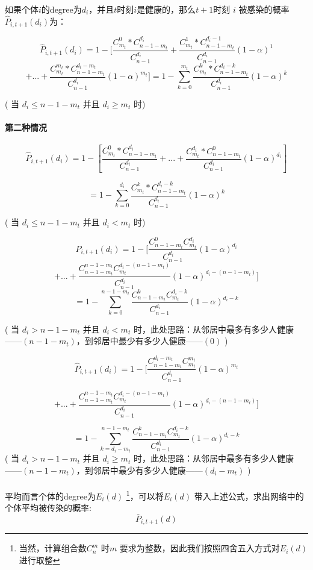 \documentclass[a4paper]{article}
\begin{document}
如果个体$i$的degree为$d_i$，并且$t$时刻$i$是健康的，那么$t+1$时刻 $i$ 被感染的概率$\hat{P}_{i,t+1}(d_i)$为：

\[\hat{P}_{i,t+1}(d_i)  =  1-[\frac{C_{m_t}^0*C_{n-1-m_t}^{d_i}} {C_{n-1}^{d_i}} +\frac{C_{m_t}^{1}*C_{n-1-m_t}^{d_i-1}} {C_{n-1}^{d_i}}(1-\alpha)^{1} \]
\[+  ...+  \frac{C_{m_t}^{m_t}*C_{n-1-m_t}^{d_i-m_t}}{C_{n-1}^{d_i}}(1-\alpha)^{m_t}    ]=1-\sum_{k=0}^{m_t} \frac{C_{m_t}^{k}*C_{n-1-m_t}^{d_i-k}}  {C_{n-1}^{d_i}} (1-\alpha)^k \]

( 当 $d_i\leq n-1-m_t$  并且 $d_i \geq m_t$ 时)
\paragraph{第二种情况}
\[\hat{P}_{i,t+1}(d_i)  =  1-[\frac{C_{m_t}^0*C_{n-1-m_t}^{d_i}} {C_{n-1}^{d_i}} + ...+  \frac{C_{m_t}^{d_i}*C_{n-1-m_t}^{0}}{C_{n-1}^{d_i}}(1-\alpha)^{d_i} ]   \]

\[=1-\sum_{k=0}^{d_i} \frac{C_{m_t}^{k}*C_{n-1-m_t}^{d_i-k}}  {C_{n-1}^{d_i}} (1-\alpha)^k\]



( 当 $d_i\leq n-1-m_t$  并且 $d_i < m_t$ 时)



\[\hat{P}_{i,t+1}(d_i) =1-[\frac{C_{n-1-m_t}^{0 } C_{m_t}^{  d_i}        } {C_{n-1}^{d_i}} (1-\alpha)^{d_i} \]
\[ +...+
\frac{C_{n-1-m_t}^{n-1-m_t } C_{m_t}^{  d_i-(n-1-m_t)}        } {C_{n-1}^{d_i}} (1-\alpha)^{d_i-(n-1-m_t)}  ]\]
\[=1-\sum_{k=0}^{n-1-m_t}\frac{C_{n-1-m_t}^kC_{m_t}^{d_i-k} }{C_{n-1}^{d_i}}
(1-\alpha)^{d_i-k}\]

( 当 $d_i > n-1-m_t$  并且 $d_i < m_t$ 时，此处思路：从邻居中最多有多少人健康——$(n-1-m_t)$，到邻居中最少有多少人健康——$(0)$ )

\[\hat{P}_{i,t+1}(d_i) =1-[\frac{C_{n-1-m_t}^{d_i-m_t }  C_{m_t}^{  m_t}        } {C_{n-1}^{d_i}} (1-\alpha)^{m_t} \]

\[+...+ \frac{C_{n-1-m_t}^{n-1-m_t } C_{m_t}^{  d_i-(n-1-m_t)}        } {C_{n-1}^{d_i}} (1-\alpha)^{d_i-(n-1-m_t)}  ]\]

\[  =1-\sum_{k=d_i-m_t}^{n-1-m_t}\frac{C_{n-1-m_t}^{k}C_{m_t}^{d_i-k} }{C_{n-1}^{d_i}}
(1-\alpha)^{d_i-k}\]
( 当 $d_i > n-1-m_t$  并且 $d_i \geq m_t$ 时，此处思路：从邻居中最多有多少人健康——$(n-1-m_t)$，到邻居中最少有多少人健康——$(d_i-m_t)$ )

\paragraph{}
平均而言个体的degree为$E_i(d)$ \footnote{ 当然，计算组合数$C_n^m$ 时$m$ 要求为整数，因此我们按照四舍五入方式对$E_i(d)$进行取整}，可以将$E_i(d)$ 带入上述公式，求出网络中的个体平均被传染的概率:
\[  \bar{P}_{i,t+1}(d) \]
\end{document}
